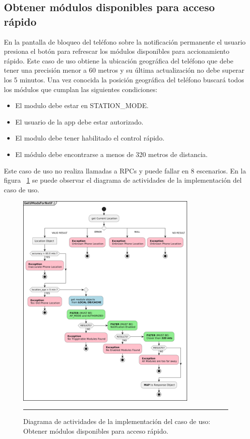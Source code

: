\subsection{Obtener módulos disponibles para acceso rápido}
En la pantalla de bloqueo del teléfono sobre la notificación permanente el usuario presiona
el botón para refrescar los módulos disponibles para accionamiento rápido.
Este caso de uso obtiene la ubicación geográfica del teléfono que debe tener una precisión menor a 60 metros
y su última actualización no debe superar los 5 minutos.
Una vez conocida la posición geográfica del teléfono buscará todos los módulos que cumplan las siguientes condiciones:
\begin{itemize}
	\item El modulo debe estar en STATION\_MODE.
	\item El usuario de la app debe estar autorizado.
	\item El modulo debe tener habilitado el control rápido.
	\item El módulo debe encontrarse a menos de 320 metros de distancia.
\end{itemize}
Este caso de uso no realiza llamadas a RPCs y puede fallar en 8 escenarios.
En la figura ~\ref{fig:act_notif_modules} se puede observar el diagrama de actividades de la implementación del caso de uso.

\begin{figure}[htbp]
	\centering
	\includegraphics[width=0.8\textwidth]{Figures/iter3/ACT_getModsNotif.png}
	\rule{35em}{1pt}
	\caption[Actividades Obtener Módulos Acceso Rápido]{Diagrama de actividades de la implementación del caso de uso: Obtener módulos disponibles para acceso rápido.}
	\label{fig:act_notif_modules}
\end{figure}

